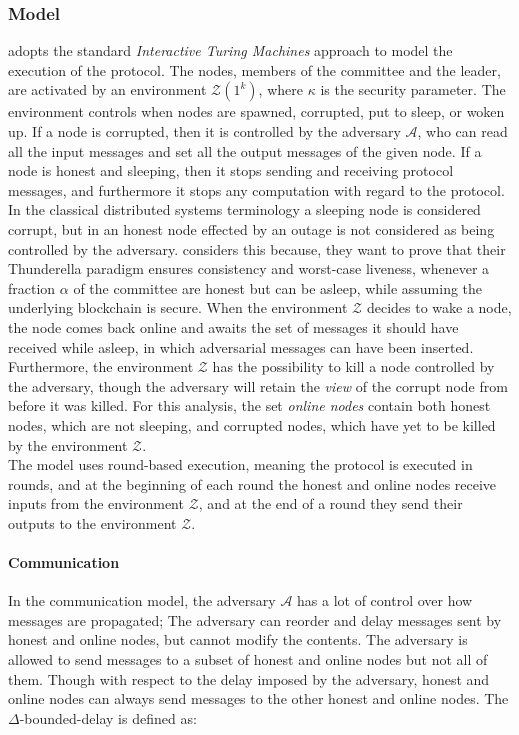 \subsubsection{Model}

\cite{thunderella} adopts the standard \emph{Interactive Turing Machines} approach to model the execution of the protocol. The nodes, members of the committee and the leader, are activated by an environment $\mathcal{Z}(1^k)$, where $\kappa$ is the security parameter. The environment controls when nodes are spawned, corrupted, put to sleep, or woken up. If a node is corrupted, then it is controlled by the adversary $\mathcal{A}$, who can read all the input messages and set all the output messages of the given node. If a node is honest and sleeping, then it stops sending and receiving protocol messages, and furthermore it stops any computation with regard to the protocol. In the classical distributed systems terminology a sleeping node is considered corrupt, but in \cite{thunderella} an honest node effected by an outage is not considered as being controlled by the adversary. \cite{thunderella} considers this because, they want to prove that their Thunderella paradigm ensures consistency and worst-case liveness, whenever a fraction $\alpha$ of the committee are honest but can be asleep, while assuming the underlying blockchain is secure. When the environment $\mathcal{Z}$ decides to wake a node, the node comes back online and awaits the set of messages it should have received while asleep, in which adversarial messages can have been inserted. Furthermore, the environment $\mathcal{Z}$ has the possibility to kill a node controlled by the adversary, though the adversary will retain the \emph{view} of the corrupt node from before it was killed. For this analysis, the set \emph{online nodes} contain both honest nodes, which are not sleeping, and corrupted nodes, which have yet to be killed by the environment $\mathcal{Z}$. \\

The model uses round-based execution, meaning the protocol is executed in rounds, and at the beginning of each round the honest and online nodes receive inputs from the environment $\mathcal{Z}$, and at the end of a round they send their outputs to the environment $\mathcal{Z}$.\\


\paragraph{Communication} In the communication model, the adversary $\mathcal{A}$ has a lot of control over how messages are propagated; The adversary can reorder and delay messages sent by honest and online nodes, but cannot modify the contents. The adversary is allowed to send messages to a subset of honest and online nodes but not all of them. Though with respect to the delay imposed by the adversary, honest and online nodes can always send messages to the other honest and online nodes. The $\Delta$-bounded-delay is defined as: \\


